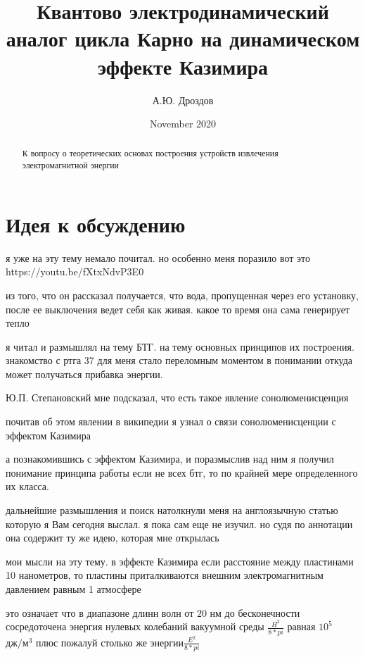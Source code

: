\documentclass[12pt, letterpaper]{article}
\begin{document}
\title{Квантово электродинамический аналог цикла Карно на динамическом эффекте Казимира}
\author{А.Ю. Дроздов}
\date{November 2020}

\begin{titlepage}
\maketitle
\end{titlepage}


\begin{abstract}
К вопросу о теоретических основах построения устройств извлечения электромагнитной энергии
\end{abstract}



\section{Идея к обсуждению}

я уже на эту тему немало почитал. но особенно меня поразило вот это
https://youtu.be/fXtxNdvP3E0

из того, что он рассказал получается, что вода, пропущенная через его установку, после ее выключения ведет себя как живая. какое то время она сама генерирует тепло

я читал и размышлял на тему БТГ. на тему основных принципов их построения. знакомство с ртга 37 для меня стало переломным моментом в понимании откуда может получаться прибавка энергии. 

Ю.П. Степановский мне подсказал, что есть такое явление сонолюменисценция

почитав об этом явлении в википедии я узнал о связи сонолюменисценции с эффектом Казимира

а познакомившись с эффектом Казимира, и поразмыслив над ним я получил понимание принципа работы если не всех бтг, то по крайней мере определенного их класса.

дальнейшие размышления и поиск натолкнули меня на англоязычную статью \cite{Chan2001} которую я Вам сегодня выслал. я пока сам еще не изучил. но судя по аннотации она содержит ту же идею, которая мне открылась

мои мысли на эту тему. в эффекте Казимира если расстояние между пластинами 10  нанометров, то пластины приталкиваются внешним электромагнитным давлением равным 1 атмосфере

это означает что в диапазоне длинн волн от $20$ нм до бесконечности сосредоточена энергия нулевых колебаний вакуумной среды $\frac{H^2}{8*pi}$ равная $10^5$ $дж/м^3$ плюс пожалуй столько же энергии$\frac{E^2}{8*pi}$
\end{document}
